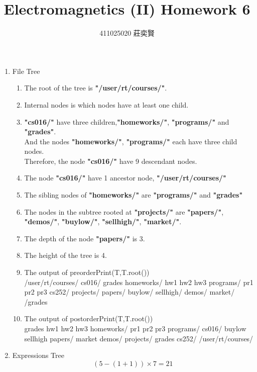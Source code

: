 \documentclass[12pt,a4paper]{article}
\begin{document}
\begin{CJK*}{UTF8}{bsmi}
\title{Electromagnetics (II) Homework 6}
\author{411025020 莊奕賢}
\maketitle

\begin{enumerate}[1.]
    \item File Tree 
    \begin{enumerate}
        \item The root of the tree is \textbf{"/user/rt/courses/"}.
        \item Internal nodes is which nodes have at least one child.
        \item \textbf{"cs016/"} have three children,\textbf{"homeworks/"}, 
        \textbf{"programs/"} and \textbf{"grades"}.\\
        And the nodes \textbf{"homeworks/"}, \textbf{"programs/"} each have three child nodes.\\
         Therefore, the node \textbf{"cs016/"} have 9 descendant nodes.
        \item The node \textbf{"cs016/"} have 1 ancestor node, \textbf{"/user/rt/courses/"}
        \item The sibling nodes of \textbf{"homeworks/"} are \textbf{"programs/"} and \textbf{"grades"}
        \item The nodes in the subtree rooted at \textbf{"projects/"} are \textbf{"papers/"}, 
        \textbf{"demos/"}, \textbf{"buylow/"}, \textbf{"sellhigh/"}, \textbf{"market/"}.
        \item The depth of the node \textbf{"papers/"} is 3.
        \item The height of the tree is 4.
        \item The output of preorderPrint(T,T.root())\\
        /user/rt/courses/ cs016/ grades homeworks/ hw1 hw2 hw3 programs/ 
        pr1 pr2 pr3 cs252/ projects/ papers/ buylow/ sellhigh/ demos/ market/ /grades
        \item The output of postorderPrint(T,T.root())\\
        grades hw1 hw2 hw3 homeworks/ pr1 pr2 pr3 programs/ cs016/ buylow sellhigh papers/ market 
        demos/ projects/ grades cs252/ /user/rt/courses/
    \end{enumerate}
    \item Expressions Tree
    $$ (5-(1+1))\times 7 = 21$$
    \begin{center}
    \end{center}
\end{enumerate}

\end{CJK*}
\end{document}
